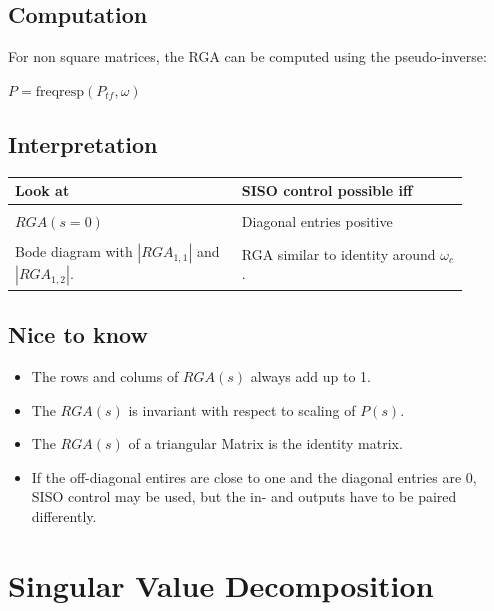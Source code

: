\documentclass[10pt,a4paper]{scrartcl}
\begin{document}
\begin{multicols*}{3}
	\subsection*{Computation}
	
	
	
	For non square matrices, the RGA can be computed using the pseudo-inverse:
	
	$P=\text{freqresp}(P_{tf},\omega)$
	
	
	\subsection*{Interpretation}
	
	
	\begin{tabular}{p{0.45\linewidth}|p{0.45\linewidth}}
	Look at&SISO control possible iff\\
	\hline\\
	$RGA(s=0)$&Diagonal entries positive\\
	\hline\\
	Bode diagram with $|RGA_{1,1}|$ and $|RGA_{1,2}|$.&RGA similar to identity around $\omega_c$.
	\end{tabular}
	\normalsize
	
	\subsection*{Nice to know}
	
	\begin{itemize}
	\compaq
	\item
	The rows and colums of $RGA(s)$ always add up to 1.
	\item
	The $RGA(s)$ is invariant with respect to scaling of $P(s)$.
	\item
	The $RGA(s)$ of a triangular Matrix is the identity matrix.
	\item
	If the off-diagonal entires are close to one and the diagonal entries are 0, SISO control may be used, but the in- and outputs have to be paired differently.
	\end{itemize}
	
	

	\section{Singular Value Decomposition}
	

\end{multicols*}
\end{document}
